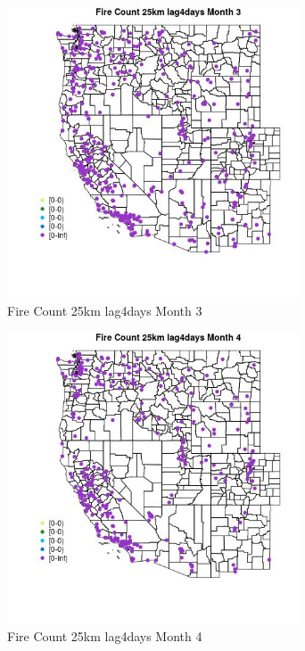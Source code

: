 \begin{figure} 
\centering  
\includegraphics[width=0.77\textwidth]{Code_Outputs/Report_ML_input_PM25_Step4_part_e_de_duplicated_aves_compiled_2019-05-18wNAs_MapObsMo3Fire_Count_25km_lag4days.jpg} 
\caption{\label{fig:Report_ML_input_PM25_Step4_part_e_de_duplicated_aves_compiled_2019-05-18wNAsMapObsMo3Fire_Count_25km_lag4days}Fire Count 25km lag4days Month 3} 
\end{figure} 
 

\clearpage 

\begin{figure} 
\centering  
\includegraphics[width=0.77\textwidth]{Code_Outputs/Report_ML_input_PM25_Step4_part_e_de_duplicated_aves_compiled_2019-05-18wNAs_MapObsMo4Fire_Count_25km_lag4days.jpg} 
\caption{\label{fig:Report_ML_input_PM25_Step4_part_e_de_duplicated_aves_compiled_2019-05-18wNAsMapObsMo4Fire_Count_25km_lag4days}Fire Count 25km lag4days Month 4} 
\end{figure} 
 

